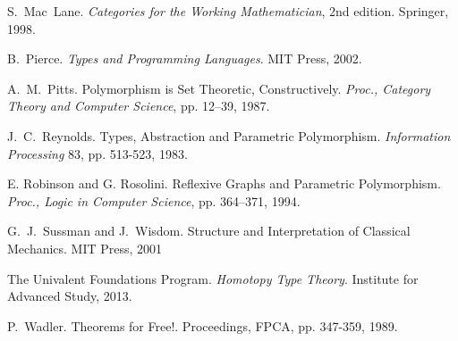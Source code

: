 \documentclass{sigplanconf}
\theoremstyle{examplestyle}
\begin{document}
\begin{thebibliography}{12}
 S.~Mac~Lane. {\em Categories for the Working
  Mathematician}, 2nd edition. Springer, 1998.

 B.~Pierce. {\em Types and Programming
  Languages}. MIT Press, 2002.

 A.~M.~Pitts.  Polymorphism is Set
  Theoretic, Constructively.  {\em Proc., Category Theory and Computer
    Science}, pp. 12--39, 1987.

J.~C.~Reynolds. Types, Abstraction and Parametric Polymorphism.
{\em Information Processing} 83, pp. 513-523, 1983.

 E. Robinson and G. Rosolini.  Reflexive
Graphs and Parametric Polymorphism.  {\em Proc., Logic in Computer
  Science}, pp. 364--371, 1994.

 G.~J.~Sussman and J.~Wisdom. Structure and
  Interpretation of Classical Mechanics. MIT Press, 2001

 The Univalent Foundations Program. {\em
    Homotopy Type Theory}. Institute for Advanced Study, 2013.

P.~Wadler.  Theorems for Free!.  Proceedings, FPCA,
pp. 347-359, 1989.

\end{thebibliography}
\end{document}
